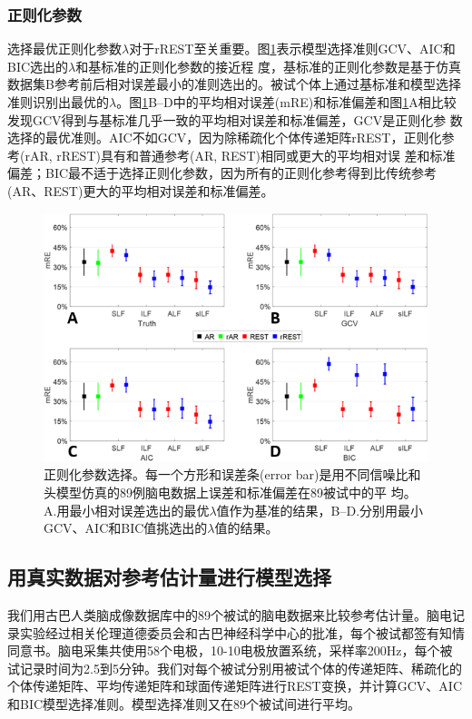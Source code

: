 \subsubsection{正则化参数}
选择最优正则化参数$\lambda$对于rREST至关重要。图\ref{3:6}表示模型选择准则GCV、AIC和BIC选出的$\lambda$和基标准的正则化参数的接近程
度，基标准的正则化参数是基于仿真数据集B参考前后相对误差最小的准则选出的。被试个体上通过基标准和模型选择准则识别出最优的$\lambda$。图\ref{3:6}B–D中的平均相对误差(mRE)和标准偏差和图\ref{3:6}A相比较发现GCV得到与基标准几乎一致的平均相对误差和标准偏差，GCV是正则化参
数选择的最优准则。AIC不如GCV，因为除稀疏化个体传递矩阵rREST，正则化参考(rAR, rREST)具有和普通参考(AR, REST)相同或更大的平均相对误
差和标准偏差；BIC最不适于选择正则化参数，因为所有的正则化参考得到比传统参考(AR、REST)更大的平均相对误差和标准偏差。
\begin{figure}[!h]
	\centering
	\includegraphics[width=15cm]{pic/Frontier/figure6.png}
	\caption{正则化参数选择。每一个方形和误差条(error bar)是用不同信噪比和头模型仿真的89例脑电数据上误差和标准偏差在89被试中的平
	均。A.用最小相对误差选出的最优$\lambda$值作为基准的结果，B–D.分别用最小GCV、AIC和BIC值挑选出的$\lambda$值的结果。}
	\label{3:6}
\end{figure}

\subsection{用真实数据对参考估计量进行模型选择}
我们用古巴人类脑成像数据库中的89个被试的脑电数据来比较参考估计量。脑电记录实验经过相关伦理道德委员会和古巴神经科学中心的批准，每个被试都签有知情同意书。脑电采集共使用58个电极，10-10电极放置系统，采样率200Hz，每个被试记录时间为2.5到5分钟。我们对每个被试分别用被试个体的传递矩阵、稀疏化的个体传递矩阵、平均传递矩阵和球面传递矩阵进行REST变换，并计算GCV、AIC和BIC模型选择准则。模型选择准则又在89个被试间进行平均。 

